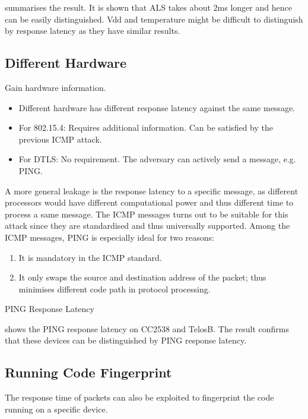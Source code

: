  summarises the result. It is shown that ALS takes about $2$ms longer and hence can be easily distinguished. Vdd and temperature might be difficult to distinguish by response latency as they have similar results.



\subsection{Different Hardware}
Gain hardware information.
\begin{itemize}
	\item Different hardware has different response latency against the same message.
	\item For 802.15.4: Requires additional information. Can be satisfied by the previous ICMP attack.
	\item For DTLS: No requirement. The adversary can actively send a message, e.g. PING.
\end{itemize}

A more general leakage is the response latency to a specific message, as different processors would have different computational power and thus different time to process a same message. The ICMP messages turns out to be suitable for this attack since they are standardised and thus universally supported. Among the ICMP messages, PING is especially ideal for two reasons: 
\begin{enumerate}
	\item It is mandatory in the ICMP standard.
	\item It only swaps the source and destination address of the packet; thus minimises different code path in protocol processing.
\end{enumerate}

\begin{table}
	\center
	
	\caption{PING Response Latency\label{PingResponse}}
\end{table}

 shows the PING response latency on CC2538 and TelosB. The result confirms that these devices can be distinguished by PING response latency.

\subsection{Running Code Fingerprint}
The response time of packets can also be exploited to fingerprint the code running on a specific device. 

